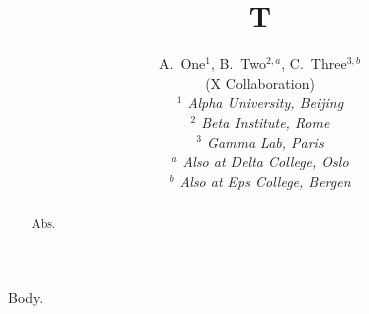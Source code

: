 \documentclass[aps,prd,superscriptaddress]{revtex4-1}
\begin{document}
\title{T}
\author{
		\begin{center}
	A.~One$^{1}$, B.~Two$^{2,a}$, C.~Three$^{3,b}$
	\\
		\vspace{0.2cm}
		(X Collaboration)\\
		\vspace{0.2cm} {\it
	$^{1}$ Alpha University, Beijing\\$^{2}$ Beta Institute, Rome\\$^{3}$ Gamma Lab, Paris\\
		\vspace{0.2cm}
		$^{a}$ Also at Delta College, Oslo\\$^{b}$ Also at Eps College, Bergen\\
		}\end{center}
		\vspace{0.4cm}
}
\begin{abstract}Abs.\end{abstract}
\maketitle
Body.
\end{document}
